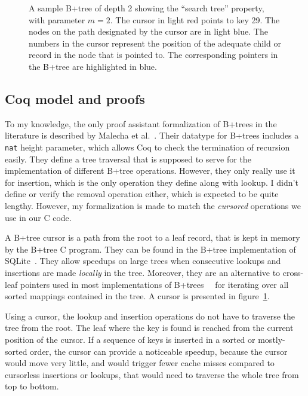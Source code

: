 \documentclass[11pt]{article}
\def\coqe{\lstinline[language=Coq, basicstyle=\small]}
\begin{document}
\begin{figure}
\caption{A sample B+tree of depth 2 showing the ``search tree'' property, with parameter $m = 2$.
The cursor in light red points to key 29. The nodes on the path designated by the cursor are in light blue.
The numbers in the cursor represent the position of the adequate child or record in the node that is pointed to. The corresponding pointers in the B+tree are highlighted in blue.}
\label{bptree}
\end{figure}

\subsection{Coq model and proofs}

To my knowledge, the only proof assistant formalization of B+trees in the literature is described by Malecha et al.~\cite{TVRDMS}.
Their datatype for B+trees includes a \coqe{nat} height parameter, which allows Coq to check the termination of recursion easily.
They define a tree traversal that is supposed to serve for the implementation of different B+tree operations.
However, they only really use it for insertion, which is the only operation they define along with lookup.
I didn't define or verify the removal operation either, which is expected to be quite lengthy.
However, my formalization is made to match the \emph{cursored} operations we use in our C code.

A B+tree cursor is a path from the root to a leaf record, that is kept in memory by the B+tree C program.
They can be found in the B+tree implementation of SQLite~\cite{DGS}.
They allow speedups on large trees when consecutive lookups and insertions are made \emph{locally} in the tree.
Moreover, they are an alternative to cross-leaf pointers used in most implementations of B+trees~\cite{TVRDMS}~\cite{DSCB} for iterating over all sorted mappings contained in the tree.
A cursor is presented in figure~\ref{bptree}.

Using a cursor, the lookup and insertion operations do not have to traverse the tree from the root.
The leaf where the key is found is reached from the current position of the cursor.
If a sequence of keys is inserted in a sorted or mostly-sorted order, the cursor can provide a noticeable speedup,
because the cursor would move very little, and would trigger fewer cache misses compared to cursorless insertions or lookups, that would need to traverse the whole tree from top to bottom.
\end{document}
